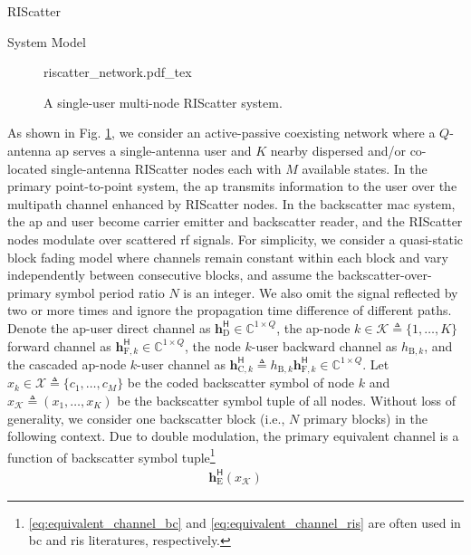 \documentclass[journal]{IEEEtran}
\begin{document}
\begin{section}{RIScatter}
	\begin{subsection}{System Model}
		\begin{figure}[!t]
			\centering
			\def\svgwidth{0.7\columnwidth}
			\footnotesize{
				{riscatter_network.pdf_tex}
			}
			\caption{A single-user multi-node RIScatter system.}
			\label{fg:riscatter_network}
		\end{figure}
		As shown in Fig. \ref{fg:riscatter_network}, we consider an active-passive coexisting network where a $Q$-antenna \gls{ap} serves a single-antenna user and $K$ nearby dispersed and/or co-located single-antenna RIScatter nodes each with $M$ available states.
		In the primary point-to-point system, the \gls{ap} transmits information to the user over the multipath channel enhanced by RIScatter nodes.
		In the backscatter \gls{mac} system, the \gls{ap} and user become carrier emitter and backscatter reader, and the RIScatter nodes modulate over scattered \gls{rf} signals.
		For simplicity, we consider a quasi-static block fading model where channels remain constant within each block and vary independently between consecutive blocks, and assume the backscatter-over-primary symbol period ratio $N$ is an integer.
		We also omit the signal reflected by two or more times and ignore the propagation time difference of different paths.
		Denote the \gls{ap}-user direct channel as $\boldsymbol{h}_{\text{D}}^\mathsf{H} \in \mathbb{C}^{1 \times Q}$, the \gls{ap}-node $k \in \mathcal{K} \triangleq \{1,\ldots,K\}$ forward channel as $\boldsymbol{h}_{\text{F},k}^\mathsf{H} \in \mathbb{C}^{1 \times Q}$, the node $k$-user backward channel as $h_{\text{B},k}$, and the cascaded \gls{ap}-node $k$-user channel as $\boldsymbol{h}_{\text{C},k}^\mathsf{H} \triangleq h_{\text{B},k} \boldsymbol{h}_{\text{F},k}^\mathsf{H} \in \mathbb{C}^{1 \times Q}$.
		Let $x_k \in \mathcal{X} \triangleq \{c_1,\ldots,c_M\}$ be the coded backscatter symbol of node $k$ and $x_{\mathcal{K}} \triangleq (x_1,\ldots,x_K)$ be the backscatter symbol tuple of all nodes.
		Without loss of generality, we consider one backscatter block (i.e., $N$ primary blocks) in the following context.
		Due to double modulation, the primary equivalent channel is a function of backscatter symbol tuple\footnote{\eqref{eq:equivalent_channel_bc} and \eqref{eq:equivalent_channel_ris} are often used in \gls{bc} and \gls{ris} literatures, respectively.}
		\begin{subequations}
			\label{eq:equivalent_channel}
			\begin{align}
				\boldsymbol{h}_{\text{E}}^\mathsf{H}(x_{\mathcal{K}})

\end{align}
\end{subequations}
\end{subsection}
\end{section}
\end{document}
